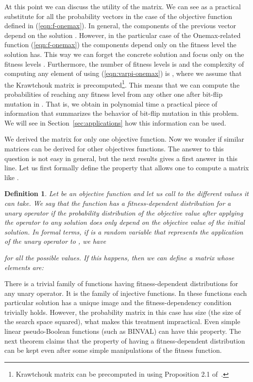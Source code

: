 \documentclass{article}
\newtheorem{definition}{Definition}
\begin{document}
At this point we can discuss the utility of the  matrix. We can see  as a practical substitute for all the probability vectors  in the case of the objective function  defined in (\ref{eqn:f-onemax}). In general, the components of the previous vector depend on the solution . However, in the particular case of the Onemax-related function (\ref{eqn:f-onemax}) the components depend only on the fitness level  the solution has. This way we can forget the concrete solution  and focus only on the fitness levels . Furthermore, the number of fitness levels is  and the complexity of computing any element of  using (\ref{eqn:varpi-onemax}) is , where we assume that the Krawtchouk matrix  is precomputed\footnote{Krawtchouk matrix  can be precomputed in  using Proposition 2.1 of~\cite{Feinsilver2005}.}. This means that we can compute the probabilities of reaching any fitness level from any other one after bit-flip mutation in . That is, we obtain in polynomial time a practical piece of information that summarizes the behavior of bit-flip mutation in this problem. We will see in Section~\ref{sec:applications} how this information can be used.

We derived the  matrix for only one objective function. Now we wonder if similar  matrices can be derived for other objectives functions. The answer to this question is not easy in general, but the next results gives a first answer in this line. Let us first formally define the property that allows one to compute a matrix like .

\begin{definition}
Let  be an objective function and let us call  to the different values it can take. We say that the function  \emph{has a fitness-dependent distribution} for a unary operator if the probability distribution of the objective value after applying the operator to any solution does only depend on the objective value of the initial solution. In formal terms, if  is a random variable that represents the application of the unary  operator to , we have

for all the possible  values. If this happens, then we can define a matrix  whose elements are:

\end{definition}

There is a trivial family of functions having fitness-dependent distributions for any unary operator. It is the family of injective functions. In these functions each particular solution has a unique image and the fitness-dependency condition trivially holds. However, the probability matrix in this case has size  (the size of the search space squared), what makes this treatment impractical. Even simple linear pseudo-Boolean functions (such as BINVAL) can have this property. 
The next theorem claims that the property of having a fitness-dependent distribution can be kept even after some simple manipulations of the fitness function.
\end{document}
